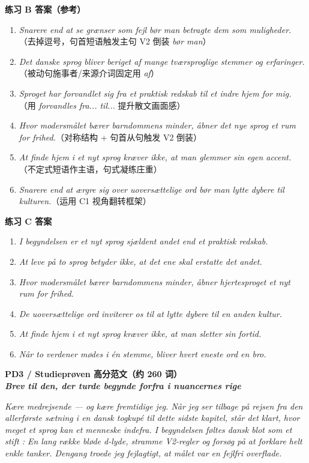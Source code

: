 \begin{answerbox}
\textbf{练习 B 答案（参考）}
\begin{enumerate}
  \item \textit{Snarere end at se grænser som fejl bør man betragte dem som muligheder.}（去掉逗号，句首短语触发主句 V2 倒装 \textit{bør man}）
  \item \textit{Det danske sprog bliver beriget af mange tværsproglige stemmer og erfaringer.}（被动句施事者/来源介词固定用 \textit{af}）
  \item \textit{Sproget har forvandlet sig fra et praktisk redskab til et indre hjem for mig.}（用 \textit{forvandles fra... til...} 提升散文画面感）
  \item \textit{Hvor modersmålet bærer barndommens minder, åbner det nye sprog et rum for frihed.}（对称结构 + 句首从句触发 V2 倒装）
  \item \textit{At finde hjem i et nyt sprog kræver ikke, at man glemmer sin egen accent.}（不定式短语作主语，句式凝练庄重）
  \item \textit{Snarere end at ærgre sig over uoversættelige ord bør man lytte dybere til kulturen.}（运用 C1 视角翻转框架）
\end{enumerate}

\textbf{练习 C 答案}
\begin{enumerate}
  \item \textit{I begyndelsen er et nyt sprog sjældent andet end et praktisk redskab.}
  \item \textit{At leve på to sprog betyder ikke, at det ene skal erstatte det andet.}
  \item \textit{Hvor modersmålet bærer barndommens minder, åbner hjertesproget et nyt rum for frihed.}
  \item \textit{De uoversættelige ord inviterer os til at lytte dybere til en anden kultur.}
  \item \textit{At finde hjem i et nyt sprog kræver ikke, at man sletter sin fortid.}
  \item \textit{Når to verdener mødes i én stemme, bliver hvert eneste ord en bro.}
\end{enumerate}

\textbf{PD3 / Studieprøven 高分范文（约 260 词）}\\
\textit{\textbf{Brev til den, der turde begynde forfra i nuancernes rige}}

\textit{Kære medrejsende --- og kære fremtidige jeg. Når jeg ser tilbage på rejsen fra den allerførste sætning i en dansk togkupé til dette sidste kapitel, står det klart, hvor meget et sprog kan  et menneske indefra. I begyndelsen føltes dansk blot som et stift : En lang række bløde d-lyde, stramme V2-regler og  forsøg på at forklare helt enkle tanker. Dengang troede jeg fejlagtigt, at målet var en fejlfri overflade.}


\end{answerbox}
